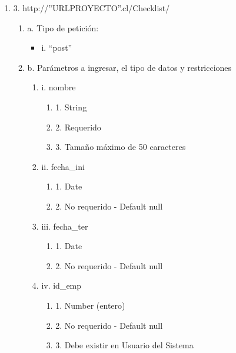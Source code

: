 \begin{enumerate}
    \item 3. http://”URLPROYECTO”.cl/Checklist/
    \begin{enumerate}
        \item a. Tipo de petición:
            \begin{itemize}
               \item i. “post”
            \end{itemize}
        \item b. Parámetros a ingresar, el tipo de datos y restricciones
            \begin{enumerate}
                \item i. nombre
                    \begin{enumerate}
                        \item 1. String
                        \item 2. Requerido
                        \item 3. Tamaño máximo de 50 caracteres
                    \end{enumerate}
                \item ii. fecha\_ini
                    \begin{enumerate}
                        \item 1. Date
                        \item 2. No requerido - Default null
                    \end{enumerate}
                \item iii. fecha\_ter
                    \begin{enumerate}
                        \item 1. Date
                        \item 2. No requerido - Default null
                    \end{enumerate}
                \item iv. id\_emp
                    \begin{enumerate}
                        \item 1. Number (entero)
                        \item 2. No requerido - Default null
                        \item 3. Debe existir en Usuario del Sistema
                    \end{enumerate}
            \end{enumerate}
    \end{enumerate}


\end{enumerate}

